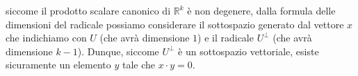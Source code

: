 \documentclass{report}
\begin{document}
\begin{mysolution}
siccome il prodotto scalare canonico di $\mathbb{R}^k$ è non degenere, dalla formula delle dimensioni del radicale possiamo considerare il sottospazio generato dal vettore $x$ che indichiamo con $U$ (che avrà dimensione $1$) e il radicale $U^{\perp}$ (che avrà dimensione $k-1$). Dunque, siccome $U^{\perp}$ è un sottospazio vettoriale, esiste sicuramente un elemento $y$ tale che $x \cdot y = 0$.
\end{mysolution}
\end{document}
